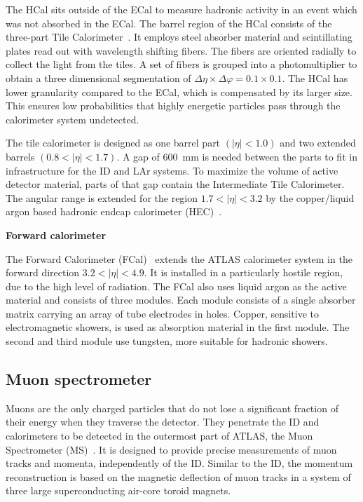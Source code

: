 \noindent
The HCal sits outside of the ECal to measure hadronic activity in an event which was not absorbed in the ECal.
The barrel region of the HCal consists of the three-part Tile Calorimeter~\cite{ATLAS-TDR-03}.
It employs steel absorber material and scintillating plates read out with
wavelength shifting fibers.
The fibers are oriented	radially to collect the	light from the tiles.
A set of fibers	is grouped into	a photomultiplier to obtain a three dimensional
segmentation of $\Delta\eta \times \Delta\varphi = 0.1\times 0.1$.
The HCal has lower granularity compared to the ECal, which is compensated by its larger size.
This ensures low probabilities that highly energetic particles pass through the calorimeter system
undetected.

The tile calorimeter is	designed as one	barrel part $(|\eta|<1.0)$
and two extended barrels $(0.8<|\eta|<1.7)$.
A gap of 600~mm	is needed	between	the parts to fit in infrastructure
for the ID and LAr systems. To maximize the volume of active detector material,
parts of that gap contain the Intermediate Tile	Calorimeter.
The angular range is extended for the region $1.7<|\eta|<3.2$ by the
copper/liquid argon based hadronic endcap calorimeter (HEC)~\cite{ATLAS-TDR-02}.

\vspace{.5cm}
\noindent
\textbf{Forward calorimeter}
\vspace{.5cm}

\noindent
The Forward Calorimeter (FCal)~\cite{ATLAS-TDR-02} extends the ATLAS calorimeter system in the forward direction $3.2<|\eta|<4.9$.
It is installed in a particularly hostile region, due to the high level of radiation.
The FCal also uses liquid argon as the active material and consists of three modules.
Each module consists of a single absorber matrix carrying an array of tube electrodes in holes.
Copper, sensitive to electromagnetic showers, is used as absorption material in the first module.
The second and third module use tungsten, more suitable for hadronic showers.


\subsection{Muon spectrometer}

Muons are the only charged particles that do not lose a significant fraction of their energy when they traverse the detector.
They penetrate the ID and calorimeters to be detected in the outermost part of ATLAS, the Muon Spectrometer (MS)~\cite{ATLAS-TDR-10}.
It is designed to provide precise measurements of muon tracks and momenta, independently of the ID.
Similar to the ID, the momentum reconstruction is based on the
magnetic deflection of muon tracks in a system of three large superconducting air-core toroid magnets.

